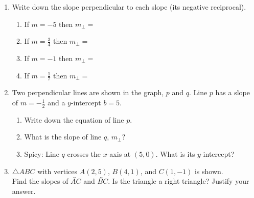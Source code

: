 \documentclass[12pt, twoside]{article}
\begin{document}
\begin{enumerate}
\newpage
\item Write down the slope perpendicular to each slope (its negative reciprocal).
  \begin{enumerate}[itemsep=0.9cm]
    \item If $m = -5$ then $m_{\perp}=$
    \item If $\displaystyle m = \frac{3}{4}$ then $m_{\perp}=$
    \item If $m = -1$ then $m_{\perp}=$
    \item If $\displaystyle m = \frac{1}{7}$ then $m_{\perp}=$
  \end{enumerate}
  
\newpage
\item Two perpendicular lines are shown in the graph, $p$ and $q$. Line $p$ has a slope of $\displaystyle m = -\frac{1}{2}$ and a $y$-intercept $b=5$.
\begin{multicols}{2}
    \begin{enumerate}[itemsep=1cm]
      \item Write down the equation of line $p$.
      \item What is the slope of line $q$, $m_\perp$?
      \item Spicy: Line $q$ crosses the $x$-axis at $(5,0)$. What is its $y$-intercept?
      \end{enumerate}
    \begin{flushright}
    \end{flushright}
\end{multicols}

\newpage
\item $\triangle ABC$ with vertices $A(2,5)$, $B(4,1)$, and $C(1,-1)$ is shown. \\[0.5cm]
Find the slopes of $\overleftrightarrow{AC}$ and $\overleftrightarrow{BC}$. Is the triangle a right triangle? Justify your answer.
  \begin{flushright}
    \end{flushright}


\end{enumerate}
\end{document}
